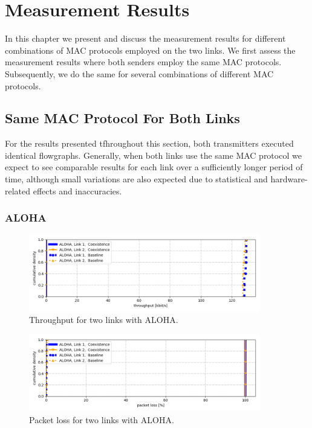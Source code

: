 \chapter{Measurement Results}
\label{ch:results}

In this chapter we present and discuss the measurement results for different combinations of MAC protocols employed on the two links.  We first assess the measurement results where both senders employ the same MAC protocols. Subsequently, we do the same for several combinations of different MAC protocols. 

\section{Same MAC Protocol For Both Links}
\label{sec:same-protocols}

For the results presented tfhroughout this section, both transmitters executed identical flowgraphs. Generally, when both links use the same MAC protocol we expect to see comparable results for each link over a sufficiently longer period of time, although small variations are also expected due to statistical and hardware-related effects and inaccuracies. 

\subsection{ALOHA}
\label{sec:dbl-aloha}

\begin{figure}[tb]
	\label{fig:results-aloha-dbl-throughput}
	\begin{center}
		\includegraphics[width=0.9\textwidth]{pictures/results/same_combinations/aloha/throughput_cdf}
	\end{center}
	\caption{Throughput for two links with ALOHA.}
\end{figure}

\begin{figure}[tb]
	\label{fig:results-aloha-dbl-packet-loss}
	\begin{center}
		\includegraphics[width=0.9\textwidth]{pictures/results/same_combinations/aloha/packet_loss_cdf}
	\end{center}
	\caption{Packet loss for two links with ALOHA.}
\end{figure}

